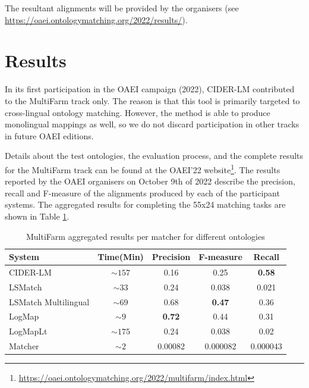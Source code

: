 \documentclass[
]{ceurart}
\begin{document}
The resultant alignments will be provided by the organisers (see \url{https://oaei.ontologymatching.org/2022/results/}).

\section{Results}

In its first participation in the OAEI campaign (2022), CIDER-LM contributed to the MultiFarm track only. The reason is that this tool is primarily targeted to cross-lingual ontology matching. However, the method is able to produce monolingual mappings as well, so we do not discard participation in other tracks in future OAEI editions. 

Details about the test ontologies, the evaluation process, and the complete results for the MultiFarm track can be found at the OAEI’22 website\footnote{\url{https://oaei.ontologymatching.org/2022/multifarm/index.html}}.
The results reported by the OAEI organisers on October 9th of 2022 describe the precision, recall and F-measure of the alignments produced by each of the participant systems. The aggregated results for completing the 55x24 matching tasks are shown in Table \ref{tab:multifarm-results}.

\begin{table}
	\caption{MultiFarm aggregated results per matcher for different ontologies}
	\label{tab:multifarm-results}
	\begin{tabular}{lcccc}
	  \toprule
	  System & Time(Min) & Precision & F-measure & Recall\\
	  \midrule
	   CIDER-LM             & $\sim 157$ & 0.16    			& 0.25     			& \textbf{0.58}    \\
	   LSMatch              & $\sim 33$  & 0.24    			& 0.038    			& 0.021            \\
	   LSMatch Multilingual & $\sim 69$  & 0.68    			& \textbf{0.47}     & 0.36             \\
	   LogMap               & $\sim 9$   & \textbf{0.72}    & 0.44     			& 0.31             \\
	   LogMapLt             & $\sim 175$ & 0.24    			& 0.038    			& 0.02             \\
	   Matcher              & $\sim 2$   & 0.00082 			& 0.000082 			& 0.000043         \\
	\bottomrule
  \end{tabular}
  \end{table}
\end{document}
